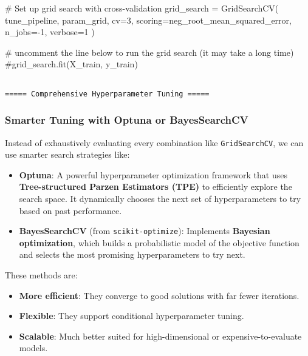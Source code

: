\documentclass[
  letterpaper,
  DIV=11,
  numbers=noendperiod]{scrreprt}
\newenvironment{Shaded}{\begin{snugshade}}{\end{snugshade}}
\newcommand{\CommentTok}[1]{\textcolor[rgb]{0.37,0.37,0.37}{#1}}
\newcommand{\DecValTok}[1]{\textcolor[rgb]{0.68,0.00,0.00}{#1}}
\newcommand{\NormalTok}[1]{\textcolor[rgb]{0.00,0.23,0.31}{#1}}
\newcommand{\OperatorTok}[1]{\textcolor[rgb]{0.37,0.37,0.37}{#1}}
\newcommand{\StringTok}[1]{\textcolor[rgb]{0.13,0.47,0.30}{#1}}
\providecommand{\tightlist}{%
  \setlength{\itemsep}{0pt}\setlength{\parskip}{0pt}}\usepackage{longtable,booktabs,array}
\begin{document}
\begin{Shaded}
\begin{Highlighting}[]
\CommentTok{\# Set up grid search with cross{-}validation}
\NormalTok{grid\_search }\OperatorTok{=}\NormalTok{ GridSearchCV(}
\NormalTok{    tune\_pipeline,}
\NormalTok{    param\_grid,}
\NormalTok{    cv}\OperatorTok{=}\DecValTok{3}\NormalTok{,}
\NormalTok{    scoring}\OperatorTok{=}\StringTok{\textquotesingle{}neg\_root\_mean\_squared\_error\textquotesingle{}}\NormalTok{,}
\NormalTok{    n\_jobs}\OperatorTok{={-}}\DecValTok{1}\NormalTok{,}
\NormalTok{    verbose}\OperatorTok{=}\DecValTok{1}
\NormalTok{)}

\CommentTok{\# uncomment the line below to run the grid search (it may take a long time)}
\CommentTok{\#grid\_search.fit(X\_train, y\_train)}
\end{Highlighting}
\end{Shaded}

\begin{verbatim}

===== Comprehensive Hyperparameter Tuning =====
\end{verbatim}

\subsubsection{Smarter Tuning with Optuna or
BayesSearchCV}\label{smarter-tuning-with-optuna-or-bayessearchcv}

Instead of exhaustively evaluating every combination like
\texttt{GridSearchCV}, we can use smarter search strategies like:

\begin{itemize}
\item
  \textbf{Optuna}: A powerful hyperparameter optimization framework that
  uses \textbf{Tree-structured Parzen Estimators (TPE)} to efficiently
  explore the search space. It dynamically chooses the next set of
  hyperparameters to try based on past performance.
\item
  \textbf{BayesSearchCV} (from \texttt{scikit-optimize}): Implements
  \textbf{Bayesian optimization}, which builds a probabilistic model of
  the objective function and selects the most promising hyperparameters
  to try next.
\end{itemize}

These methods are:

\begin{itemize}
\tightlist
\item
  \textbf{More efficient}: They converge to good solutions with far
  fewer iterations.
\item
  \textbf{Flexible}: They support conditional hyperparameter tuning.
\item
  \textbf{Scalable}: Much better suited for high-dimensional or
  expensive-to-evaluate models.
\end{itemize}
\end{document}
